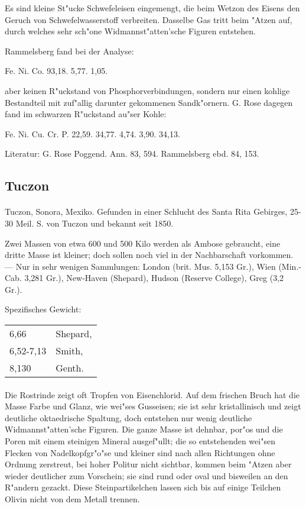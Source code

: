 \documentclass[a4paper, 11pt, oneside]{article}
\begin{document}
Es sind kleine St"ucke Schwefeleisen eingemengt, die beim Wetzon des Eisens den Geruch von Schwefelwasserstoff verbreiten. Dasselbe Gas tritt beim "Atzen auf, durch welches sehr sch"one Widmannst"atten'sche Figuren entstehen.

Rammelsberg fand bei der Analyse:

Fe. Ni. Co.  
93,18. 5,77. 1,05.

aber keinen R"uckstand von Phosphorverbindungen, sondern nur einen kohlige Bestandteil mit zuf"allig darunter gekommenen Sandk"ornern. G. Rose dagegen fand im schwarzen R"uckstand au"ser Kohle:

Fe. Ni. Cu. Cr. P.  
22,59. 34,77. 4,74. 3,90. 34,13.

Literatur: G. Rose Poggend. Ann. 83, 594. Rammelsberg ebd. 84, 153.

\subsection{Tuczon}
\normalsize
\paragraph{}
Tuczon, Sonora, Mexiko. Gefunden in einer Schlucht des Santa Rita Gebirges, 25-30 Meil. S. von Tuczon und bekannt seit 1850.

Zwei Massen von etwa 600 und 500 Kilo werden als Ambose gebraucht, eine dritte Masse ist kleiner; doch sollen noch viel in der Nachbarschaft vorkommen. --- Nur in sehr wenigen Sammlungen: London (brit. Mus. 5,153 Gr.), Wien (Min.-Cab. 3,281 Gr.), New-Haven (Shepard), Hudson (Reserve College), Greg (3,2 Gr.).

Spezifisches Gewicht:  
\begin{table}[!ht]
    \centering
    \begin{tabular}{l l}
        6,66 & Shepard,\\
        6,52-7,13 & Smith,\\
        8,130 & Genth.
    \end{tabular}
\end{table}
\paragraph{}
Die Rostrinde zeigt oft Tropfen von Eisenchlorid. Auf dem frischen Bruch hat die Masse Farbe und Glanz, wie wei"ses Gusseisen; sie ist sehr kristallinisch und zeigt deutliche oktaedrische Spaltung, doch entstehen nur wenig deutliche Widmannst"atten'sche Figuren. Die ganze Masse ist dehnbar, por"os und die Poren mit einem steinigen Mineral ausgef"ullt; die so entstehenden wei"sen Flecken von Nadelkopfgr"o"se und kleiner sind nach allen Richtungen ohne Ordnung zerstreut, bei hoher Politur nicht sichtbar, kommen beim "Atzen aber wieder deutlicher zum Vorschein; sie sind rund oder oval und bisweilen an den R"andern gezackt. Diese Steinpartikelchen lassen sich bis auf einige Teilchen Olivin nicht von dem Metall trennen.
\end{document}
